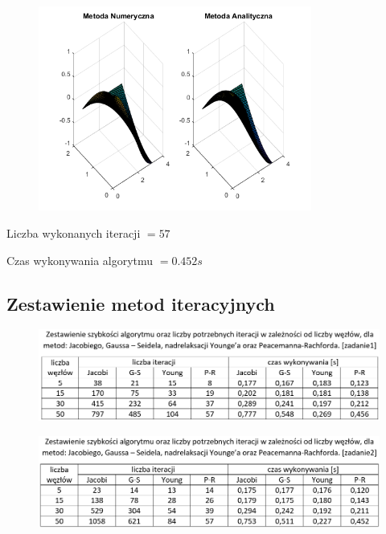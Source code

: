 \begin{figure}[!ht]
	\begin{center}
		\includegraphics[width=0.8\textwidth]{Lab6/charts/pr/zad2/50.png}
	\end{center}
\end{figure}

Liczba wykonanych iteracji $ = 57 $

Czas wykonywania algorytmu $ = 0.452 s$

\newpage

\subsection{Zestawienie metod iteracyjnych}
\begin{figure}[!ht]
	\begin{center}
		\includegraphics[width=1\textwidth]{Lab6/charts/zestawienie_zad1.png}
	\end{center}
\end{figure}

\begin{figure}[!ht]
	\begin{center}
		\includegraphics[width=1\textwidth]{Lab6/charts/zestawienie_zad2.png}
	\end{center}
\end{figure}